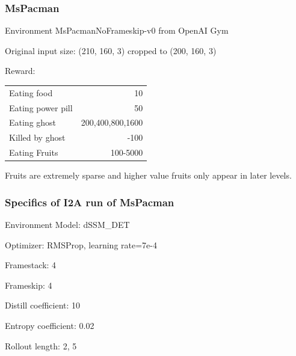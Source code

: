 \begin{frame}
	\frametitle{MsPacman}
	\begin{PraesentationAufzaehlung}
		\item Environment MsPacmanNoFrameskip-v0 from OpenAI Gym
		\item Original input size: (210, 160, 3) cropped to (200, 160, 3)
	
		\item Reward:\\
		\vspace{5mm}
		\hspace{-4mm}
		\begin{tabular}{ p{7cm}  r }
	  	Eating food & 10 \\
		Eating power pill & 50\\
		Eating ghost & 200,400,800,1600\\
		Killed by ghost & -100\\
		Eating Fruits & 100-5000\\
		\end{tabular}
		\vspace{5mm}
		\item Fruits are extremely sparse and higher value fruits only appear in later levels.
	\end{PraesentationAufzaehlung}
\end{frame}

\begin{frame}
	\frametitle{Specifics of I2A run of MsPacman}
	\begin{PraesentationAufzaehlung}
		\item Environment Model: dSSM\_DET
		\item Optimizer: RMSProp, learning rate=7e-4
		\item Framestack: 4
		\item Frameskip: 4
		\item Distill coefficient: 10
		\item Entropy coefficient: 0.02
		\item Rollout length: 2, 5
	\end{PraesentationAufzaehlung}
\end{frame}

